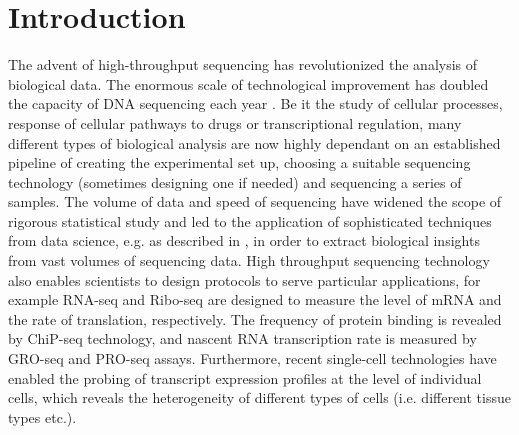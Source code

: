 \renewcommand{\subsectionmark}[1]{%
  \ifsubsectioninheader
    \def\subsectiontitle{: #1}%
  \else
    \def\subsectiontitle{}%
  \fi}
\newif\ifsubsectioninheader
\def\subsectiontitle{}
\fancyhead[L]{\nouppercase{\rightmark\ifsubsectioninheader\subsectiontitle\fi}}
\fancyhead[R]{\thepage}

\chapter{Introduction}
The advent of high-throughput sequencing has revolutionized the analysis of biological data. The enormous scale of technological improvement has doubled the capacity of DNA sequencing each year \citep{reuter2015high}. Be it the study of cellular processes, response of cellular pathways to drugs or transcriptional regulation, many different types of biological analysis are now highly dependant on an established pipeline of creating the experimental set up, choosing a suitable sequencing technology (sometimes designing one if needed) and sequencing a series of samples. The volume of data and speed of sequencing have widened the scope of rigorous statistical study and led to the application of sophisticated techniques from data science, e.g. as described in \citep{schatz2015biological}, in order to extract biological insights from vast volumes of sequencing data. High throughput sequencing technology also enables scientists to design protocols to serve particular applications, for example RNA-seq \citep{mortazavi2008mapping} and Ribo-seq \citep{gerashchenko2012genome} are designed to measure the level of mRNA and the rate of translation, respectively. The frequency of protein binding is revealed by ChiP-seq \citep{zhang2008model} technology, and nascent RNA transcription rate is measured by GRO-seq and PRO-seq \citep{core2008nascent} assays. Furthermore, recent single-cell technologies have enabled the probing of transcript expression profiles at the level of individual cells, which reveals the heterogeneity of different types of cells (i.e. different tissue types etc.). 

